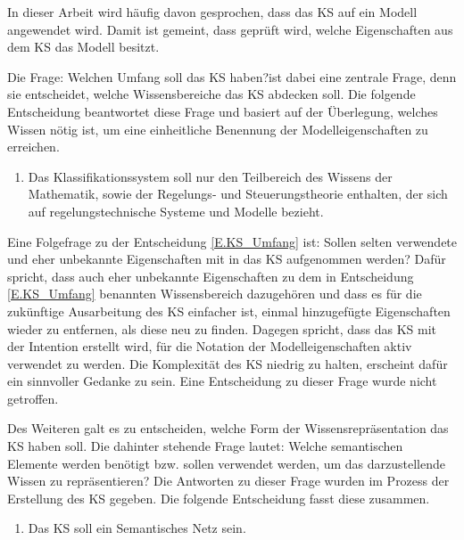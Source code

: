 In dieser Arbeit wird häufig davon gesprochen, dass das KS auf ein Modell angewendet wird. Damit ist gemeint, dass geprüft wird, welche Eigenschaften aus dem KS das Modell besitzt. 

Die Frage: \glqq Welchen Umfang soll das KS haben?\grqq ist dabei eine zentrale Frage, denn sie entscheidet, welche Wissensbereiche das KS abdecken soll. Die folgende Entscheidung beantwortet diese Frage und basiert auf der Überlegung, welches Wissen nötig ist, um eine einheitliche Benennung der Modelleigenschaften zu erreichen. 
\begin{enumerate}[resume*]
	\item \label{E.KS_Umfang}Das Klassifikationssystem soll nur den Teilbereich des Wissens der Mathematik, sowie der Regelungs- und Steuerungstheorie enthalten, der sich auf regelungstechnische Systeme und Modelle bezieht.
\end{enumerate}

Eine Folgefrage zu der Entscheidung \ref{E.KS_Umfang} ist: Sollen selten verwendete und eher unbekannte Eigenschaften mit in das KS aufgenommen werden? Dafür spricht, dass auch eher unbekannte Eigenschaften zu dem in Entscheidung \ref{E.KS_Umfang} benannten Wissensbereich dazugehören und dass es für die zukünftige Ausarbeitung des KS einfacher ist, einmal hinzugefügte Eigenschaften wieder zu entfernen, als diese neu zu finden. Dagegen spricht, dass das KS mit der Intention erstellt wird, für die Notation der Modelleigenschaften aktiv verwendet zu werden. Die Komplexität des KS niedrig zu halten, erscheint dafür ein sinnvoller Gedanke zu sein. Eine Entscheidung zu dieser Frage wurde nicht getroffen.

Des Weiteren galt es zu entscheiden, welche Form der Wissensrepräsentation das KS haben soll. Die dahinter stehende Frage lautet: Welche semantischen Elemente werden benötigt bzw. sollen verwendet werden, um das darzustellende Wissen zu repräsentieren? Die Antworten zu dieser Frage wurden im Prozess der Erstellung des KS gegeben. Die folgende Entscheidung fasst diese zusammen.
\begin{enumerate}[resume*]
	\item \label{E.KS_SemantischesNetz}Das KS soll ein Semantisches Netz sein. %
\end{enumerate}

